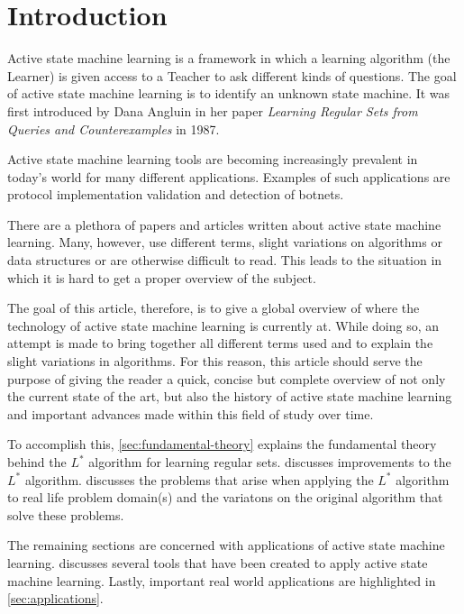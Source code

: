 \documentclass[multi,crop=false,class=article]{standalone}
\begin{document}
\section*{Introduction}
\label{sec:introduction}

Active state machine learning is a framework in which a learning algorithm (the
Learner) is given access to a Teacher to ask different kinds of questions. The
goal of active state machine learning is to identify an unknown state machine.
It was first introduced by Dana Angluin in her paper \textit{Learning Regular
  Sets from Queries and Counterexamples} in 1987\cite{Angluin1987}.

Active state machine learning tools are becoming increasingly prevalent in
today's world for many different applications. Examples of such applications are
protocol implementation validation and detection of botnets.

There are a plethora of papers and articles written about active state machine
learning. Many, however, use different terms, slight variations on algorithms
or data structures or are otherwise difficult to read. This leads to the
situation in which it is hard to get a proper overview of the subject.

The goal of this article, therefore, is to give a global overview of where the
technology of active state machine learning is currently at. While doing so, an
attempt is made to bring together all different terms used and to explain the
slight variations in algorithms. For this reason, this article should serve the
purpose of giving the reader a quick, concise but complete overview of not only
the current state of the art, but also the history of active state machine
learning and important advances made within this field of study over time.

To accomplish this, \cref{sec:fundamental-theory} explains the fundamental
theory behind the $L^{*}$ algorithm for learning regular
sets.  discusses improvements to the $L^{*}$
algorithm.  discusses the problems that arise when applying
the $L^{*}$ algorithm to real life problem domain(s) and the variatons on the
original algorithm that solve these problems.

The remaining sections are concerned with applications of active state machine
learning.  discusses several tools that have been created to
apply active state machine learning. Lastly, important real world applications
are highlighted in \cref{sec:applications}.

\newpage
\end{document}
